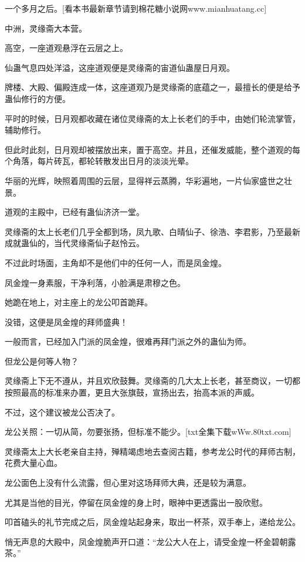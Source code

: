 
\begin{this_body}

一个多月之后。[看本书最新章节请到棉花糖小说网www.mianhuatang.cc]

中洲，灵缘斋大本营。

高空，一座道观悬浮在云层之上。

仙蛊气息四处洋溢，这座道观便是灵缘斋的宙道仙蛊屋日月观。

牌楼、大殿、偏殿连成一体，这座道观乃是灵缘斋的底蕴之一，最擅长的便是给予蛊仙修行的方便。

平时的时候，日月观都收藏在诸位灵缘斋的太上长老们的手中，由她们轮流掌管，辅助修行。

但此时此刻，日月观却被摆放出来，置于高空。并且，还催发威能，整个道观的每个角落，每片砖瓦，都轮转散发出日月的淡淡光晕。

华丽的光辉，映照着周围的云层，显得祥云蒸腾，华彩遍地，一片仙家盛世之壮景。

道观的主殿中，已经有蛊仙济济一堂。

灵缘斋的太上长老们几乎全都到场，凤九歌、白晴仙子、徐浩、李君影，乃至最新成就蛊仙的，当代灵缘斋仙子赵怜云。

不过此时场面，主角却不是他们中的任何一人，而是凤金煌。

凤金煌一身素服，干净利落，小脸满是肃穆之色。

她跪在地上，对主座上的龙公叩首跪拜。

没错，这便是凤金煌的拜师盛典！

一般而言，已经加入门派的凤金煌，很难再拜门派之外的蛊仙为师。

但龙公是何等人物？

灵缘斋上下无不遵从，并且欢欣鼓舞。灵缘斋的几大太上长老，甚至商议，一切都按照最高的标准来办置，更且大张旗鼓，宣扬出去，抬高本派的声威。

不过，这个建议被龙公否决了。

龙公关照：一切从简，勿要张扬，但标准不能少。[txt全集下载wWw.80txt.com]

灵缘斋太上大长老亲自主持，殚精竭虑地去查阅古籍，参考龙公时代的拜师古制，花费大量心血。

龙公面色上没有什么流露，但心里对这场拜师大典，还是较为满意。

尤其是当他的目光，停留在凤金煌的身上时，眼神中更透露出一股欣慰。

叩首磕头的礼节完成之后，凤金煌站起身来，取出一杯茶，双手奉上，递给龙公。

悄无声息的大殿中，凤金煌脆声开口道：“龙公大人在上，请受金煌一杯金碧朝露茶。”


\end{this_body}
